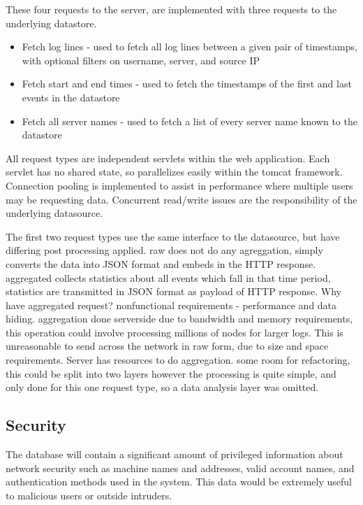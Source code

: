 These four requests to the server, are implemented with three requests to the underlying datastore.

\begin{itemize}
\item{Fetch log lines - used to fetch all log lines between a given pair of timestamps, with optional filters on username, server, and source IP}
\item{Fetch start and end times - used to fetch the timestamps of the first and last events in the datastore}
\item{Fetch all server names - used to fetch a list of every server name known to the datastore}
\end{itemize}

All request types are independent servlets within the web application. Each servlet has no shared state, so parallelizes easily within the tomcat framework. Connection pooling is implemented to assist in performance where multiple users may be requesting data. Concurrent read/write issues are the responsibility of the underlying datasource.

The first two request types use the same interface to the datasource, but have differing post processing applied. raw does not do any agreggation, simply converts the data into JSON format and embeds in the HTTP response. aggregated collects statistics about all events which fall in that time period, statistics are transmitted in JSON format as payload of HTTP response.
Why have aggregated request? nonfunctional requirements - performance and data hiding. aggregation done serverside due to bandwidth and memory requirements, this operation could involve processing millions of nodes for larger logs. This is unreasonable to send across the network in raw form, due to size and space requirements. Server has resources to do aggregation. 
some room for refactoring, this could be split into two layers
however the processing is quite simple, and only done for this one request type, so a data analysis layer was omitted.

\subsection{Security}\label{des_sec}

The database will contain a significant amount of privileged information about network security such as machine names and addresses, valid account names, and authentication methods used in the system. This data would be extremely useful to malicious users or outside intruders. 

